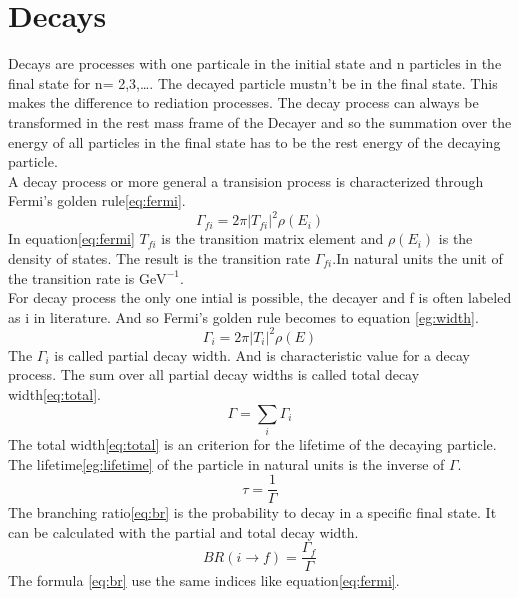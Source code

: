 \section{Decays}
Decays are processes with one particale in the initial state and n particles 
in the final state for n= 2,3,{\ldots}. The decayed particle mustn't be in the final 
state. This makes the difference to rediation processes. The decay process can 
always be transformed in the rest mass frame of the Decayer and so the 
summation over the energy of all particles in the final state has to be the 
rest energy of the decaying particle.\\
A decay process or more general a transision process is characterized through 
Fermi's golden rule{\eqref{eq:fermi}}.
\begin{equation}
  \Gamma_{fi} = 2 \pi |T_{fi}|^2 \rho\left(E_i\right) \label{eq:fermi}
\end{equation}
In equation{\eqref{eq:fermi}} \(T_{fi}\) is the transition matrix element and 
\(\rho\left(E_i\right)\) is the density of states. The result is the transition 
rate \(\Gamma_{fi}\).In natural units the unit of the transition rate is \(\text{GeV}^{-1}\).\\
For decay process the only one intial is possible, the decayer and f is often 
labeled as i in literature. And so Fermi's golden rule becomes to equation
{\eqref{eg:width}}.
\begin{equation}
  \Gamma_i = 2 \pi |T_i|^2 \rho\left(E\right) \label{eq:width}
\end{equation}
The \(\Gamma_i\) is called partial decay width. And is characteristic value 
for a decay process. The sum over all partial decay widths is called 
total decay width{\eqref{eq:total}}.
\begin{equation}
  \Gamma = \sum_i \Gamma_i \label{eq:total}
\end{equation}
The total width{\eqref{eq:total}} is an criterion for the lifetime of the 
decaying particle. The lifetime{\eqref{eg:lifetime}} of the particle in natural units is the 
inverse of \(\Gamma\).
\begin{equation}
  \tau = \frac{1}{\Gamma} \label{eq:lifetime}
\end{equation}
The branching ratio{\eqref{eq:br}} is the probability to decay in a specific final 
state. It can be calculated with the partial and total decay width.
\begin{equation}
  BR( i \rightarrow f) = \frac{\Gamma_f}{\Gamma} \label{eq:br}
\end{equation}
The formula {\eqref{eq:br}} use the same indices like equation{\eqref{eq:fermi}}.

